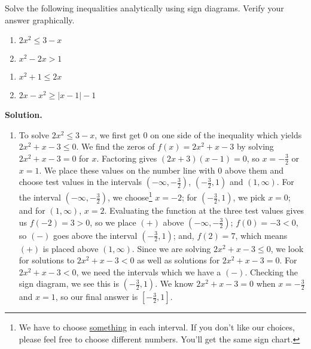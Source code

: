 \begin{ex}  Solve the following inequalities analytically using sign diagrams.  Verify your answer graphically.

\begin{multicols}{2}
\begin{enumerate}

\item  $2x^2 \leq 3-x$

\item  $x^2 - 2x > 1$

\setcounter{HW}{\value{enumi}}
\end{enumerate}
\end{multicols}

\begin{multicols}{2}
\begin{enumerate}
\setcounter{enumi}{\value{HW}}

\item  $x^2+1 \leq 2x$

\item  $2x-x^2 \geq |x-1|-1$

\end{enumerate}
\end{multicols}

{\bf Solution.}  

\begin{enumerate}

\item  To solve $2x^2 \leq 3-x$, we first get $0$ on one side of the inequality which yields $2x^2+x-3 \leq 0$.  We find the zeros of $f(x) = 2x^2 + x - 3$ by solving $2x^2 + x - 3 = 0$ for $x$.  Factoring gives $(2x+3)(x-1)=0$, so $x = -\frac{3}{2}$ or $x = 1$.  We place these values on the number line with $0$ above them and choose test values in the intervals $\left(-\infty, -\frac{3}{2}\right)$, $\left(-\frac{3}{2},1\right)$ and $(1,\infty)$.  For the interval  $\left(-\infty, -\frac{3}{2}\right)$, we choose\footnote{We have to choose \underline{something} in each interval.  If you don't like our choices, please feel free to choose different numbers.  You'll get the same sign chart.} $x=-2$; for $\left(-\frac{3}{2},1\right)$, we pick $x=0$; and for $(1,\infty)$, $x=2$. Evaluating the function at the three test values gives us $f(-2) = 3 > 0$, so we place $(+)$ above $\left(-\infty, -\frac{3}{2}\right)$;  $f(0)=-3 < 0$, so $(-)$ goes above the interval $\left(-\frac{3}{2},1\right)$;  and, $f(2) = 7$, which means $(+)$ is placed above $(1,\infty)$.  Since we are solving $2x^2+x-3 \leq 0$, we look for solutions to $2x^2+x-3 < 0$ as well as solutions for $2x^2+x-3 =0$.  For $2x^2+x-3 < 0$, we need the intervals which we have a $(-)$.  Checking the sign diagram, we see this is $\left(-\frac{3}{2},1\right)$.  We know $2x^2+x-3 =0$ when $x=-\frac{3}{2}$ and $x=1$, so our final answer is $\left[-\frac{3}{2},1\right]$.  


\end{enumerate}
\end{ex}
